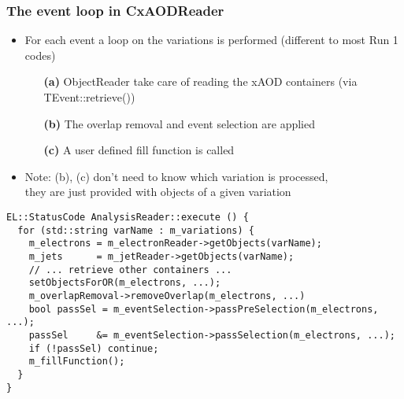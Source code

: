 \documentclass{beamer}
\begin{document}
\begin{frame}[fragile]
\frametitle{The event loop in CxAODReader}
\begin{itemize}
 \item For each event a loop on the variations is performed (different to most Run 1 codes)
\begin{itemize}
\scriptsize
 \item[{\bf (a)}] ObjectReader take care of reading the xAOD containers (via TEvent::retrieve())
 \item[{\bf (b)}] The overlap removal and event selection are applied
 \item[{\bf (c)}] A user defined fill function is called
\end{itemize}
 \item Note: (b), (c) don't need to know which variation is processed, \\
 they are just provided with objects of a given variation
\end{itemize}
\begin{center}
\begin{minipage}{0.9\textwidth}
{\tiny
\begin{lstlisting}
EL::StatusCode AnalysisReader::execute () {
  for (std::string varName : m_variations) {
    m_electrons = m_electronReader->getObjects(varName);
    m_jets      = m_jetReader->getObjects(varName);
    // ... retrieve other containers ...
    setObjectsForOR(m_electrons, ...);
    m_overlapRemoval->removeOverlap(m_electrons, ...)
    bool passSel = m_eventSelection->passPreSelection(m_electrons, ...);
    passSel     &= m_eventSelection->passSelection(m_electrons, ...);
    if (!passSel) continue;
    m_fillFunction();
  }
}
\end{lstlisting}
}
\end{minipage}
\end{center}
\end{frame}
\end{document}
